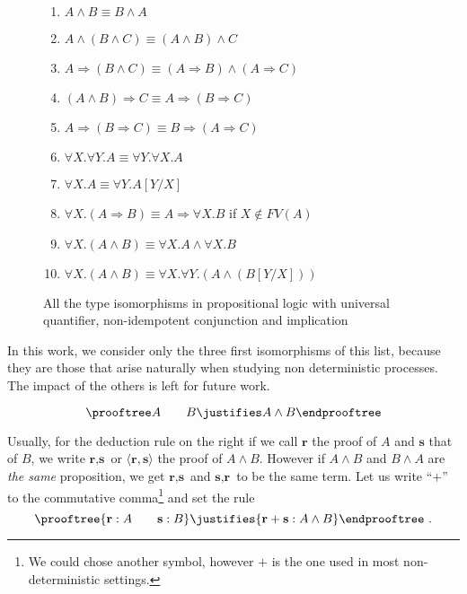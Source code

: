 \documentclass[final,copyright,creativecommons]{eptcs}
\newcommand{\ve}[1]{\ensuremath{\mathrm{\textbf{#1}}}}
\theoremstyle{definition}
\begin{document}
\begin{figure}[!h]
\begin{multicols}{2}
 \begin{enumerate}
  \item\label{iso:comm} $A\wedge B\equiv B\wedge A$
  \item\label{iso:asso} $A\wedge (B\wedge C)\equiv (A\wedge B)\wedge C$
  \item\label{iso:distrib} $A\Rightarrow(B\wedge C)\equiv (A\Rightarrow B)\wedge(A\Rightarrow C)$
  \item\label{iso:currying} $(A\wedge B)\Rightarrow C\equiv A\Rightarrow (B\Rightarrow C)$
  \item\label{iso:ordering} $A\Rightarrow (B\Rightarrow C)\equiv B\Rightarrow(A\Rightarrow C)$
  \item $\forall X.\forall Y.A\equiv \forall Y.\forall X.A$
  \item $\forall X.A\equiv \forall Y.A[Y/X]$
  \item $\forall X.(A\Rightarrow B)\equiv A\Rightarrow \forall X.B$ if $X\notin FV(A)$
  \item $\forall X.(A\wedge B)\equiv \forall X.A\wedge\forall X.B$
  \item $\forall X.(A\wedge B)\equiv \forall X.\forall Y.(A\wedge (B[Y/X]))$
 \end{enumerate}
\end{multicols}
 \caption{All the type isomorphisms in propositional logic with universal quantifier, non-idempotent conjunction and implication}
 \label{fig:iso}
\end{figure}

In this work, we consider only the three first isomorphisms of this list,
because they are those that arise naturally when studying non deterministic
processes. The impact of the others is left for future work.

\begin{wrapfigure}{r}{0.1\textwidth}\vspace{-0.7cm}
$$\prooftree A\qquad B
  \justifies A \wedge B
  \endprooftree$$
\end{wrapfigure}Usually, for the deduction rule on the right
if we call $\ve r$ the proof of $A$ and $\ve s$ that of $B$, we write $\ve r, \ve s$ or $\langle\ve r,\ve s\rangle$ the proof of $A \wedge B$. However if $A \wedge B$ and $B \wedge A$ are {\em the same} proposition, we get $\ve r, \ve s$ and $\ve s, \ve r$ to be the same term. Let us write ``$+$'' to the commutative comma\footnote{We could chose another symbol, however $+$ is the one used in most non-deterministic settings.} and set the rule
$$\prooftree{ \ve r:A\qquad \ve s:B}
  \justifies{ \ve r + \ve s:A \wedge B}
  \endprooftree\ .$$
\end{document}
